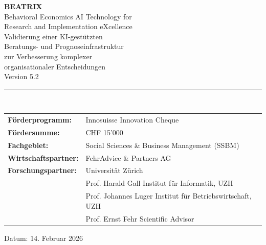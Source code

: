\documentclass[11pt,a4paper]{article}
\begin{document}

\begin{titlepage}
\centering
\vspace*{2cm}

{\Huge\bfseries\color{fehrblue} BEATRIX}\\[0.5cm]
{\Large Behavioral Economics AI Technology for\\Research and Implementation eXcellence}\\[2cm]

{\LARGE Validierung einer KI-gestützten\\Beratungs- und Prognoseinfrastruktur\\zur Verbesserung komplexer\\organisationaler Entscheidungen}\\[1.5cm]

{\large Version 5.2}\\[2cm]

\rule{0.8\textwidth}{0.5pt}\\[1.5cm]

\begin{tabular}{ll}
\textbf{Förderprogramm:} & Innosuisse Innovation Cheque \\[0.3cm]
\textbf{Fördersumme:} & CHF 15'000 \\[0.3cm]
\textbf{Fachgebiet:} & Social Sciences \& Business Management (SSBM) \\[0.3cm]
\textbf{Wirtschaftspartner:} & FehrAdvice \& Partners AG \\[0.3cm]
\textbf{Forschungspartner:} & Universität Zürich \\[0.3cm]
& Prof. Harald Gall \quad Institut für Informatik, UZH \\
& Prof. Johannes Luger \quad Institut für Betriebswirtschaft, UZH \\
& Prof. Ernst Fehr \quad Scientific Advisor \\
\end{tabular}

\vfill


\vfill

{\large Datum: 14. Februar 2026}

\end{titlepage}
\end{document}
